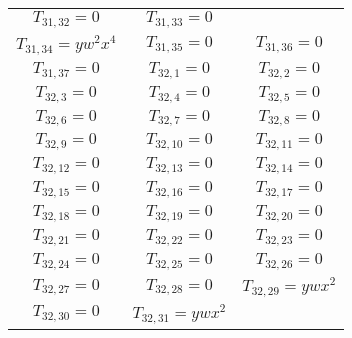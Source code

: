\begin{longtable}{|c|c|c|}
$T_{31,32}= 0$&

$T_{31,33}= 0$\\

$T_{31,34}= yw^2x^4$&

$T_{31,35}= 0$&

$T_{31,36}= 0$\\

$T_{31,37}= 0$&

$T_{32,1}= 0$&

$T_{32,2}= 0$\\

$T_{32,3}= 0$&

$T_{32,4}= 0$&

$T_{32,5}= 0$\\

$T_{32,6}= 0$&

$T_{32,7}= 0$&

$T_{32,8}= 0$\\

$T_{32,9}= 0$&

$T_{32,10}= 0$&

$T_{32,11}= 0$\\

$T_{32,12}= 0$&

$T_{32,13}= 0$&

$T_{32,14}= 0$\\

$T_{32,15}= 0$&

$T_{32,16}= 0$&

$T_{32,17}= 0$\\

$T_{32,18}= 0$&

$T_{32,19}= 0$&

$T_{32,20}= 0$\\

$T_{32,21}= 0$&

$T_{32,22}= 0$&

$T_{32,23}= 0$\\

$T_{32,24}= 0$&

$T_{32,25}= 0$&

$T_{32,26}= 0$\\

$T_{32,27}= 0$&

$T_{32,28}= 0$&

$T_{32,29}= ywx^2$\\

$T_{32,30}= 0$&

$T_{32,31}= ywx^2$&


\end{longtable}
